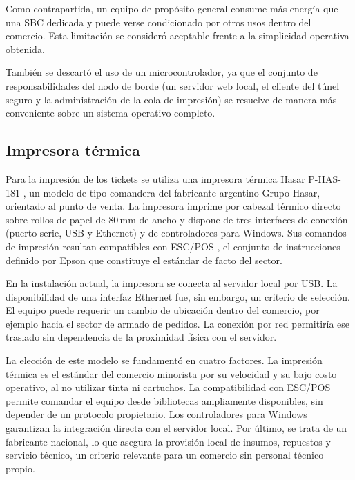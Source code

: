 Como contrapartida, un equipo de propósito general consume más energía que una SBC dedicada y puede verse condicionado por otros usos dentro del comercio. Esta limitación se consideró aceptable frente a la simplicidad operativa obtenida.

También se descartó el uso de un microcontrolador, ya que el conjunto de responsabilidades del nodo de borde (un servidor web local, el cliente del túnel seguro y la administración de la cola de impresión) se resuelve de manera más conveniente sobre un sistema operativo completo.

\subsection{Impresora térmica}
\label{subsec:impresora}

Para la impresión de los tickets se utiliza una impresora térmica Hasar P-HAS-181 \cite{hasar181}, un modelo de tipo comandera del fabricante argentino Grupo Hasar, orientado al punto de venta. La impresora imprime por cabezal térmico directo sobre rollos de papel de 80\,mm de ancho y dispone de tres interfaces de conexión (puerto serie, USB y Ethernet) y de controladores para Windows. Sus comandos de impresión resultan compatibles con ESC/POS \cite{escpos}, el conjunto de instrucciones definido por Epson que constituye el estándar de facto del sector.

En la instalación actual, la impresora se conecta al servidor local por USB. La disponibilidad de una interfaz Ethernet fue, sin embargo, un criterio de selección. El equipo puede requerir un cambio de ubicación dentro del comercio, por ejemplo hacia el sector de armado de pedidos. La conexión por red permitiría ese traslado sin dependencia de la proximidad física con el servidor.

La elección de este modelo se fundamentó en cuatro factores. La impresión térmica es el estándar del comercio minorista por su velocidad y su bajo costo operativo, al no utilizar tinta ni cartuchos. La compatibilidad con ESC/POS permite comandar el equipo desde bibliotecas ampliamente disponibles, sin depender de un protocolo propietario. Los controladores para Windows garantizan la integración directa con el servidor local. Por último, se trata de un fabricante nacional, lo que asegura la provisión local de insumos, repuestos y servicio técnico, un criterio relevante para un comercio sin personal técnico propio.


